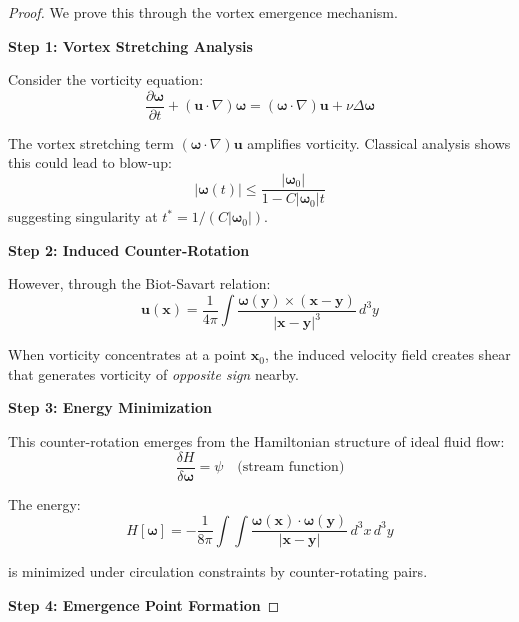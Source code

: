 \begin{proof}
We prove this through the vortex emergence mechanism.

\textbf{Step 1: Vortex Stretching Analysis}

Consider the vorticity equation\cite{majda2002}:
\begin{equation}
\frac{\partial \boldsymbol{\omega}}{\partial t} + (\mathbf{u} \cdot \nabla)\boldsymbol{\omega} = (\boldsymbol{\omega} \cdot \nabla)\mathbf{u} + \nu \Delta \boldsymbol{\omega}
\end{equation}

The vortex stretching term $(\boldsymbol{\omega} \cdot \nabla)\mathbf{u}$ amplifies vorticity. Classical analysis shows this could lead to blow-up:
\begin{equation}
|\boldsymbol{\omega}(t)| \leq \frac{|\boldsymbol{\omega}_0|}{1 - C|\boldsymbol{\omega}_0|t}
\end{equation}
suggesting singularity at $t^* = 1/(C|\boldsymbol{\omega}_0|)$.

\textbf{Step 2: Induced Counter-Rotation}

However, through the Biot-Savart relation:
\begin{equation}
\mathbf{u}(\mathbf{x}) = \frac{1}{4\pi} \int \frac{\boldsymbol{\omega}(\mathbf{y}) \times (\mathbf{x} - \mathbf{y})}{|\mathbf{x} - \mathbf{y}|^3} \, d^3y
\end{equation}

When vorticity concentrates at a point $\mathbf{x}_0$, the induced velocity field creates shear that generates vorticity of \textit{opposite sign} nearby.

\textbf{Step 3: Energy Minimization}

This counter-rotation emerges from the Hamiltonian structure of ideal fluid flow:
\begin{equation}
\frac{\delta H}{\delta \boldsymbol{\omega}} = \psi \quad \text{(stream function)}
\end{equation}

The energy:
\begin{equation}
H[\boldsymbol{\omega}] = -\frac{1}{8\pi} \int \int \frac{\boldsymbol{\omega}(\mathbf{x}) \cdot \boldsymbol{\omega}(\mathbf{y})}{|\mathbf{x} - \mathbf{y}|} \, d^3x \, d^3y
\end{equation}

is minimized under circulation constraints by counter-rotating pairs.

\textbf{Step 4: Emergence Point Formation}


\end{proof}
